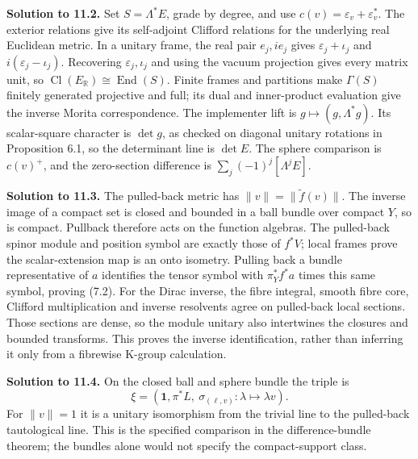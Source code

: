 \documentclass[
  11pt,
]{article}
\begin{document}
\textbf{Solution to 11.2.} Set \(S=\Lambda^*E\), grade by degree, and
use \(c(v)=\varepsilon_v+\varepsilon_v^*\). The exterior relations give
its self-adjoint Clifford relations for the underlying real Euclidean
metric. In a unitary frame, the real pair \(e_j,ie_j\) gives
\(\varepsilon_j+\iota_j\) and \(i(\varepsilon_j-\iota_j)\). Recovering
\(\varepsilon_j,\iota_j\) and using the vacuum projection gives every
matrix unit, so
\(\operatorname{Cl}(E_{\mathbb R})\cong\operatorname{End}(S)\). Finite
frames and partitions make \(\Gamma(S)\) finitely generated projective
and full; its dual and inner-product evaluation give the inverse Morita
correspondence. The implementer lift is \(g\mapsto(g,\Lambda^*g)\). Its
scalar-square character is \(\det g\), as checked on diagonal unitary
rotations in Proposition 6.1, so the determinant line is \(\det E\). The
sphere comparison is \(c(v)^+\), and the zero-section difference is
\(\sum_j(-1)^j[\Lambda^jE]\).

\textbf{Solution to 11.3.} The pulled-back metric has
\(\|v\|=\|\widetilde f(v)\|\). The inverse image of a compact set is
closed and bounded in a ball bundle over compact \(Y\), so is compact.
Pullback therefore acts on the function algebras. The pulled-back spinor
module and position symbol are exactly those of \(f^*V\); local frames
prove the scalar-extension map is an onto isometry. Pulling back a
bundle representative of \(a\) identifies the tensor symbol with
\(\pi_Y^*f^*a\) times this same symbol, proving (7.2). For the Dirac
inverse, the fibre integral, smooth fibre core, Clifford multiplication
and inverse resolvents agree on pulled-back local sections. Those
sections are dense, so the module unitary also intertwines the closures
and bounded transforms. This proves the inverse identification, rather
than inferring it only from a fibrewise K-group calculation.

\textbf{Solution to 11.4.} On the closed ball and sphere bundle the
triple is \[
\xi=(\mathbf1,\pi^*L,\
\sigma_{(\ell,v)}:\lambda\mapsto\lambda v).
\tag{12.1}
\] For \(\|v\|=1\) it is a unitary isomorphism from the trivial line to
the pulled-back tautological line. This is the specified comparison in
the difference-bundle theorem; the bundles alone would not specify the
compact-support class.
\end{document}
